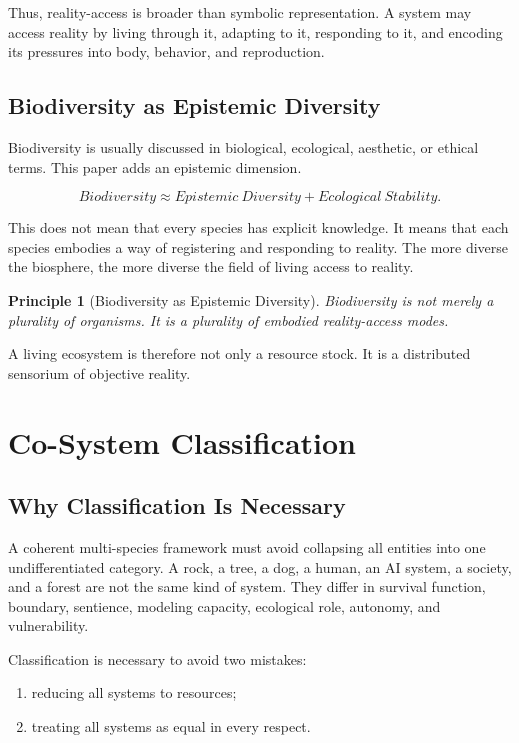 \documentclass[11pt,a4paper]{article}
\newtheorem{principle}{Principle}
\begin{document}
Thus, reality-access is broader than symbolic representation. A system may access reality by living through it, adapting to it, responding to it, and encoding its pressures into body, behavior, and reproduction.

\subsection{Biodiversity as Epistemic Diversity}

Biodiversity is usually discussed in biological, ecological, aesthetic, or ethical terms. This paper adds an epistemic dimension.

\[
Biodiversity
\approx
Epistemic\ Diversity
+
Ecological\ Stability.
\]

This does not mean that every species has explicit knowledge. It means that each species embodies a way of registering and responding to reality. The more diverse the biosphere, the more diverse the field of living access to reality.

\begin{principle}[Biodiversity as Epistemic Diversity]
Biodiversity is not merely a plurality of organisms. It is a plurality of embodied reality-access modes.
\end{principle}

A living ecosystem is therefore not only a resource stock. It is a distributed sensorium of objective reality.

\section{Co-System Classification}

\subsection{Why Classification Is Necessary}

A coherent multi-species framework must avoid collapsing all entities into one undifferentiated category. A rock, a tree, a dog, a human, an AI system, a society, and a forest are not the same kind of system. They differ in survival function, boundary, sentience, modeling capacity, ecological role, autonomy, and vulnerability.

Classification is necessary to avoid two mistakes:
\begin{enumerate}[label=(\roman*)]
\item reducing all systems to resources;
\item treating all systems as equal in every respect.
\end{enumerate}
\end{document}
